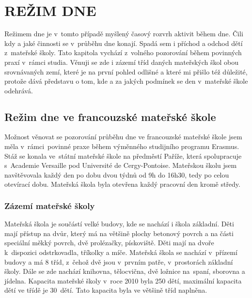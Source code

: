 \chapter{REŽIM DNE}
\label{rezim}
	Režimem dne je v tomto případě myšlený časový rozvrh aktivit během dne. Čili kdy a jaké činnosti se v průběhu dne konají. Spadá sem i příchod a odchod dětí z mateřské školy. Tato kapitola vychází z volného pozorování během povinných praxí v rámci studia. Věnuji se zde i zázemí tříd daných mateřských škol obou srovnávaných zemí, které je na první pohled odlišné a které mi přišlo též důležité, protože dává představu o tom, kde a za jakých podmínek se den v mateřské škole odehrává. 

	\section{Režim dne ve francouzské mateřské škole}

		Možnost věnovat se pozorování průběhu dne ve francouzské mateřské škole jsem měla v rámci povinné praxe během výměnného studijního programu Erasmus. Stáž se konala ve státní mateřské škole na předměstí Paříže, která spolupracuje s Academie Versaille pod Université de Cergy-Pontoise. Mateřskou školu jsem navštěvovala každý den po dobu dvou týdnů od 9h do 16h30, tedy po celou otevírací dobu. Mateřská škola byla otevřena každý pracovní den kromě středy. 

		\subsection{Zázemí mateřské školy}

			Mateřská škola je součástí velké budovy, kde se nachází i škola základní. Děti mají přístup na dvůr, který má na většině plochy betonový povrch a na části speciální měkký povrch, dvě prolézačky, pískoviště. Děti mají na dvoře k dispozici odstrkovadla, tříkolky a míče. 
			Mateřská škola se nachází v přízemí budovy a má 8 tříd, z čehož dvě jsou v prvním patře, v prostorách 	základní školy. Dále se zde nachází knihovna, tělocvična, dvě ložnice na spaní, sborovna a jídelna. 
			Kapacita mateřské školy v roce 2010 byla 250 dětí, maximální kapacita dětí ve třídě je 30 dětí. Tato kapacita byla ve většině tříd naplněna.


